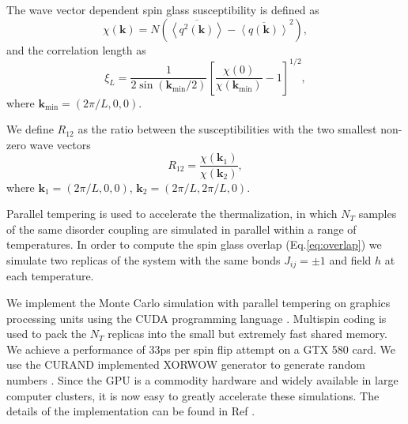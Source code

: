 \documentclass[aps,prb,twocolumn,showpacs,superscriptaddress]{revtex4}
\renewcommand{\vec}[1]{\mathbf{#1}}
\begin{document}
The wave vector dependent spin glass susceptibility is defined as \cite{Marinari-etal-1998}
\begin{equation}
  \label{eq:chi}
  \chi(\vec{k})= N(\overline{\left<q^2(\vec{k})\right>}-\overline{\left<q(\vec{k})\right>}^2),
\end{equation}
and the correlation length as 
\begin{equation}
  \label{eq:corr}
  \xi_L=\frac{1}{2\sin(\vec{k}_{\mathrm{min}}/2)}\left[\frac{\chi(0)}{\chi(\vec{k}_{\mathrm{min}})}-1\right]^{1/2},
\label{eq:corrlength}
\end{equation}
where $\vec{k}_{\mathrm{min}}=(2\pi/L,0,0)$. 

We define $R_{12}$ as the ratio between the susceptibilities with the two smallest non-zero wave 
vectors \cite{Banos-2012}
\begin{equation}
  \label{eq:r12}
  R_{12}=\frac{\chi(\vec{k}_1)}{\chi(\vec{k}_2)},
\end{equation}
where $\vec{k}_1=(2\pi/L,0,0)$, $\vec{k}_2=(2\pi/L,2\pi/L,0)$.


Parallel tempering\cite{Hukushima-Nemoto1996,Marinari-Parisi1992} is used to accelerate the thermalization, 
in which $N_T$ samples of the same disorder coupling are simulated in parallel within a range 
of temperatures. In order to compute 
the spin glass overlap (Eq.\ref{eq:overlap}) we simulate two replicas 
of the system with the same bonds $J_{ij}=\pm 1$ and field $h$ at each temperature. 

We implement the Monte Carlo simulation with parallel tempering on graphics 
processing units using the CUDA programming language \cite{Nickolls:2008:SPP:1365490.1365500}. 
Multispin coding\cite{PhysRevLett.42.1390,Zorn1981337} is used 
to pack the $N_T$ replicas into the small but extremely fast shared 
memory. We achieve a performance of 33ps per spin flip attempt on a GTX 580 card.
We use the CURAND implemented XORWOW generator to generate random numbers \cite{curand}.
Since the GPU is a commodity hardware and widely available in large
computer clusters, it is now easy to greatly accelerate these 
simulations. The details of the implementation can be found in Ref . 
\end{document}
